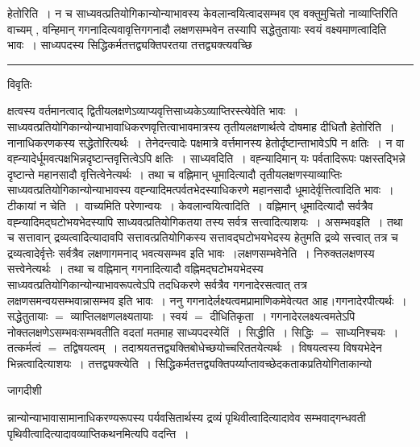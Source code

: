 \documentclass[10pt, openany]{book}
\begin{document}
{{\la हेतोरिति~। न च साध्यवत्प्रतियोगिकान्योन्याभावस्य केवलान्वयित्वादसम्भव एव वक्तुमुचितो नाव्याप्तिरिति वाच्यम् , वन्हिमान् गगनादित्यवावृत्तिगगनादौ लक्षणसम्भवेन तस्यापि सद्धेतुतायाः स्वयं वक्ष्यमाणत्वादिति भावः~। साध्यपदस्य सिद्धिकर्मतत्तद्व्यक्तिपरतया तत्तद्व्यक्त्यवच्छि}\\
\hrule
\begin{center}     विवृतिः \end{center}
क्षत्वस्य वर्तमानत्वाद् द्वितीयलक्षणेऽव्याप्यवृत्तिसाध्यकेऽव्याप्तिरस्त्येवेति भावः~। साध्यवत्प्रतियोगिकान्योन्याभावाधिकरणवृत्तित्वाभावमात्रस्य तृतीयलक्षणार्थत्वे दोषमाह दीधितौ हेतोरिति~। नानाधिकरणकस्य सद्धेतोरित्यर्थः~। तेनेदन्त्वादेः पक्षमात्रे वर्त्तमानस्य हेतोर्दृष्टान्ताभावेऽपि न क्षतिः~। न वा वह्न्यादेर्धूमवत्पक्षभिन्नदृष्टान्तवृत्तित्वेऽपि क्षतिः~। साध्यवदिति~। वह्न्यादिमान् यः पर्वतादिरूपः पक्षस्तद्भिन्ने दृष्टान्ते महानसादौ वृत्तित्वेनेत्यर्थः~। तथा च वह्निमान् धूमादित्यादौ तृतीयलक्षणस्याव्याप्तिः साध्यवत्प्रतियोगिकान्योन्याभावस्य वह्न्यादिमत्पर्वतभेदस्याधिकरणे महानसादौ धूमादेर्वृत्तित्वादिति भावः~। टीकायां {\la न चेति~।}~वाच्यमिति परेणान्वयः~। केवलान्वयित्वादिति~। वह्निमान् धूमादित्यादौ सर्वत्रैव वह्न्यादिमद्घटोभयभेदस्यापि साध्यवत्प्रतियोगिकतया तस्य सर्वत्र सत्त्वादित्याशयः~। असम्भवइति~। तथा च सत्तावान् द्रव्यत्वादित्यादावपि सत्तावत्प्रतियोगिकस्य सत्तावद्घटोभयभेदस्य हेतुमति द्रव्ये सत्त्वात् तत्र च द्रव्यत्वादेर्वृत्तेः सर्वत्रैव लक्षणागमनाद् भवत्यसम्भव इति भावः~।लक्षणसम्भवेनेति~। निरुक्तलक्षणस्य सत्त्वेनेत्यर्थः~। तथा च वह्निमान् गगनादित्यादौ {\qt वह्निमद्घटोभयभेदस्य} साध्यवत्प्रतियोगिकान्योन्याभावरूपत्वेऽपि
तदधिकरणे सर्वत्रैव गगनादेरसत्वात् तत्र लक्षणसमन्वयसम्भवान्नासम्भव इति भावः~। ननु गगनादेर्लक्ष्यत्वमप्रामाणिकमेवेत्यत आह।गगनादेरपीत्यर्थः~। सद्धेतुतायाः $=$ व्याप्तिलक्षणलक्ष्यतायाः~। स्वयं $=$ दीधितिकृता~। गगनादेरलक्ष्यत्वमतेऽपि नोक्तलक्षणेऽसम्भवःसम्भवतीति वदतां मतमाह साध्यपदस्येतिं~। सिद्धीति~। सिद्धिः $=$ साध्यनिश्चयः~। तत्कर्मत्वं $=$ तद्विषयत्वम्~। तदाश्रयतत्तद्व्यक्तिबोधेच्छयोच्चरिततयेत्यर्थः~। विषयत्वस्य विषयभेदेन
भिन्नत्वादित्याशयः~। तत्तद्व्यक्त्येति~। सिद्धिकर्मतत्तद्व्यक्तिपर्य्याप्तावच्छेदकताकप्रतियोगिताकान्यो
\newpage
\begin{center} जागदीशी \end{center}
{\la न्नान्योन्याभावासामानाधिकरण्यरूपस्य पर्यवसितार्थस्य द्रव्यं पृथिवीत्वादित्यादावेव सम्भवाद्गन्धवती पृथिवीत्वादित्यादावव्याप्तिकथनमित्यपि वदन्ति~।\\

}}
\end{document}
